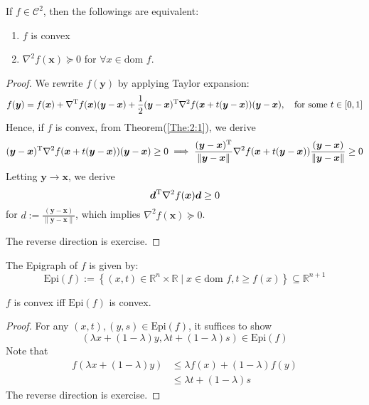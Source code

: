 \begin{theorem}
If $f\in\mathcal{C}^2$, then the followings are equivalent:
\begin{enumerate}
\item
$f$ is convex
\item
$\nabla^2f(\bm x)\succeq0$ for $\forall x\in\mbox{dom }f$.
\end{enumerate}
\end{theorem}
\begin{proof}
We rewrite $f(\bm y)$ by applying Taylor expansion:
\[
f(\bm y) = f(\bm x)+\nabla^{\mathrm T} f(\bm x)(\bm y-\bm x)+\frac{1}{2}(\bm y-\bm x)^{\mathrm T}\nabla^2 f(\bm x+t(\bm y-\bm x))(\bm y-\bm x),\quad\mbox{for some }
t\in[0,1]
\]
Hence, if $f$ is convex, from Theorem(\ref{The:2:1}), we derive
\[
(\bm y-\bm x)^{\mathrm T}\nabla^2 f(\bm x+t(\bm y-\bm x))(\bm y-\bm x)\ge0\implies \frac{(\bm y-\bm x)^{\mathrm T}}{\|\bm y-\bm x\|}\nabla^2 f(\bm x+t(\bm y-\bm x))\frac{(\bm y-\bm x)}{\|\bm y-\bm x\|}\ge0
\]
Letting $\bm y\to\bm x$, we derive
\[
\bm d^{\mathrm T}\nabla^2 f(\bm x)\bm d\ge0
\]
for $d:=\frac{(\bm y-\bm x)}{\|\bm y-\bm x\|}$, which implies $\nabla^2 f(\bm x)\succeq0$.

The reverse direction is exercise.
\end{proof}
\begin{definition}[Epigraph]
The Epigraph of $f$ is given by:
\[
\mbox{Epi}(f):=\left\{
(x,t)\in\mathbb{R}^{n}\times\mathbb{R}\mid
x\in\mbox{dom }f,
t\ge f(x)
\right\}\subseteq\mathbb{R}^{n+1}
\]
\end{definition}
\begin{theorem}
$f$ is convex iff $\mbox{Epi}(f)$ is convex.
\end{theorem}
\begin{proof}
For any $(x,t),(y,s)\in \mbox{Epi}(f)$, it suffices to show
\[
(\lambda x+(1-\lambda)y, \lambda t+(1-\lambda)s)\in \mbox{Epi}(f)
\]
Note that
\begin{align*}
f(\lambda x+(1-\lambda)y)&\le \lambda f(x)+ (1-\lambda)f(y)\\
&\le \lambda t + (1-\lambda)s
\end{align*}
The reverse direction is exercise.
\end{proof}

